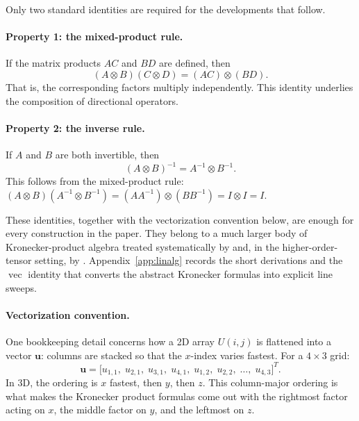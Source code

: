 \documentclass[11pt]{article}
\newcommand{\kron}{\otimes}
\newcommand{\vect}{\operatorname{vec}}
\begin{document}
Only two standard identities are required for the developments that
follow.

\paragraph{Property 1: the mixed-product rule.}
If the matrix products $AC$ and $BD$ are defined, then
\begin{equation}
\label{eq:mixed-product}
  (A \kron B)(C \kron D) = (AC) \kron (BD).
\end{equation}
That is, the corresponding factors multiply independently.  This
identity underlies the composition of directional operators.

\paragraph{Property 2: the inverse rule.}
If $A$ and $B$ are both invertible, then
\begin{equation}
\label{eq:kron-inv}
  (A \kron B)^{-1} = A^{-1} \kron B^{-1}.
\end{equation}
This follows from the mixed-product rule:
$(A \kron B)(A^{-1} \kron B^{-1}) = (AA^{-1}) \kron (BB^{-1}) = I \kron I = I$.

These identities, together with the vectorization convention below,
are enough for every construction in the paper.  They belong to a
much larger body of Kronecker-product algebra treated systematically
by \citet{golub2013matrix,loan2000ubiquitous} and, in the
higher-order-tensor setting, by \citet{kolda2009tensor}.
Appendix~\ref{app:linalg} records the short derivations and the
$\vect{}$ identity that converts the abstract Kronecker formulas into
explicit line sweeps.

\paragraph{Vectorization convention.}
One bookkeeping detail concerns how a 2D array $U(i,j)$ is flattened
into a vector $\bm{u}$: columns are stacked so that the $x$-index
varies fastest.
For a $4 \times 3$ grid:
\begin{equation}
  \bm{u} = \bigl[
    u_{1,1},\; u_{2,1},\; u_{3,1},\; u_{4,1},\;
    u_{1,2},\; u_{2,2},\; \ldots,\;
    u_{4,3}
  \bigr]^T.
\end{equation}
In 3D, the ordering is $x$ fastest, then $y$, then $z$.  This
column-major ordering is what makes the Kronecker product formulas come
out with the rightmost factor acting on $x$, the middle factor on $y$,
and the leftmost on $z$.
\end{document}
